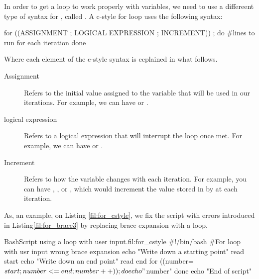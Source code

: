 In order to get a  loop to work properly with variables, we need to use a differeent type of syntax for , called . A c-style for loop uses the following syntax:
\begin{command_line}[Bash]
for ((ASSIGNMENT ; LOGICAL EXPRESSION ; INCREMENT)) ; do
    #lines to run for each iteration
done    
\end{command_line}
Where each element of the c-style syntax is ecplained in what follows.
\begin{description}
\item[Assignment] Refers to the initial value assigned to the variable that will be used in our iterations. For example, we can have  or .
\item[logical expression] Refers to a logical expression that will interrupt the loop once met. For example, we can have  or .
\item[Increment] Refers to how the variable changes with each iteration. For example, you can have , , or , which would increment the value stored in  by  at each iteration.
\end{description}
As, an example, on Listing \ref{fil:for_cstyle}, we fix the script with errors introduced in Listing\ref{fil:for_brace3} by replacing brace expansion with a  loop.
\begin{source_code_float}{Bash}{Script using a  loop with user input.}{fil:for_cstyle}
#!/bin/bash
#For loop with usr input wrong brace expansion 
echo "Write down a starting point"
read start
echo "Write down an end point"
read end
for ((number=$start; number<=end; number++)) ; do
   echo "$number"
done
echo "End of script"
\end{source_code_float}
